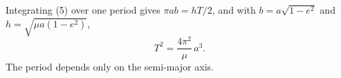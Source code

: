 Integrating (5) over one period gives $\pi a b = hT/2$, and with
$b = a\sqrt{1-e^2}$ and $h = \sqrt{\mu a(1-e^2)}$,
\begin{equation}
  T^2 = \frac{4\pi^2}{\mu}\,a^3.
\end{equation}
The period depends only on the semi-major axis.
